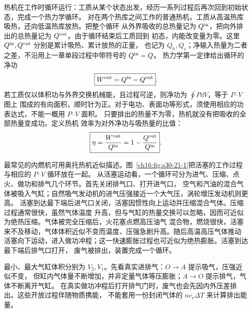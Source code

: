 {热机在工作时循环运行：工质从某个状态出发，经历一系列过程后再次回到初始状态，完成一个热力学循环。
对在两个热库之间工作的普通热机，工质从高温热库吸热，还向低温热库放热。把整个循环
从外界吸收的总热量记为 $Q^{\rm in}$，把向外排出的总热量记为 $Q^{\rm out}$。由于循环结束后工质回到
初态，内能改变量为零。这里 $Q^{\rm in},Q^{\rm out}$ 分别是累计吸热、累计放热的正量，
也记为 $Q_h,Q_c$；净输入热量为二者之差，不沿用上一章单段过程中带符号的 $Q^{\rm in}=Q$。
热力学第一定律给出循环的净功
\begin{equation}
  \boxed{W^{\rm out}=Q^{\rm in}-Q^{\rm out}}.
\end{equation}
若工质仅以体积功与外界交换机械能，且过程可逆，则净功为 $\oint P\dd V$，等于 $P$--$V$ 图上
围成的有向面积，顺时针为正。对于电功、表面功等形式，须使用相应的功表达式，不能一概用 $P$--$V$ 面积。
只要排出的热量不为零，热机就没有把吸收的全部热量变成功。定义热机
效率为对外净功与吸热量的比值：
\begin{equation}
  \boxed{\eta=\frac{W^{\rm out}}{Q^{\rm in}}
  =1-\frac{Q^{\rm out}}{Q^{\rm in}}}.
\end{equation}

最常见的内燃机可用奥托热机近似描述。图~\ref{ch16:fig:s30-21-1}把活塞的工作过程与相应的 $P$--$V$ 循环放在一起。
从活塞运动看，一个循环可分为进气、压缩、点火、做功和排气几个环节。首先关闭排气口、打开进气口，
空气和汽油的混合气体被吸入气缸；自然吸气发动机的进气压强接近一个大气压，涡轮增压发动机则更高。
活塞到达最下端后进气口关闭，活塞因惯性向上运动并压缩混合气体。压缩过程通常很快，虽然气体温度
升高，但与气缸的热量交换可以忽略，因而可近似为绝热压缩。气体被完全压缩后，火花塞点燃高压油气
混合物，燃烧很快，活塞来不及移动，气体体积近似不变而温度、压强急剧升高。随后高温高压气体推动
活塞向下运动，进入做功冲程；这一快速膨胀过程也可近似为绝热膨胀。活塞到达最下端后排气口打开，
废气被排出，装置完成一个循环。

\par\noindent\begin{minipage}{\linewidth}
\ottoCycleFigure
{}\label{ch16:fig:s30-21-1}
\end{minipage}\par\medskip

最小、最大气缸体积分别为 $V_2,V_1$。先看真实进排气：$O\to A$ 提示吸气，压强近似不变，
但缸内气体量不断增加，并非定量气体等压膨胀；$A\to O$ 提示排气，气体不断离开气缸。
在真实做功冲程后打开排气门时，废气也会先因内外压差排出。这些开放过程伴随物质携能，
不能套用一份封闭气体的 $nc_v\Delta T$ 来计算排出能量。

}
